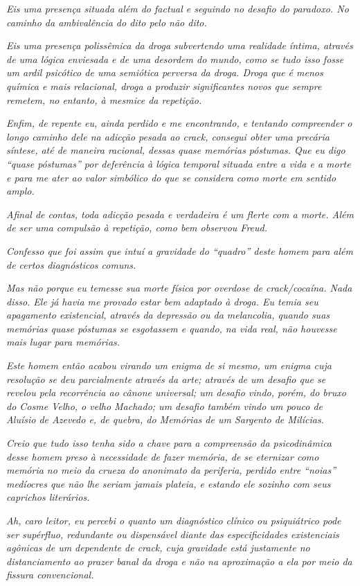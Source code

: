 \emph{Eis uma presença situada além do factual e seguindo no desafio do
paradoxo. No caminho da ambivalência do dito pelo não dito.}~

\emph{Eis uma presença polissêmica da droga subvertendo uma realidade
íntima, através de uma lógica enviesada e de uma desordem do mundo, como
se tudo isso fosse um ardil psicótico de uma semiótica perversa da
droga. Droga que é menos química e mais relacional, droga a produzir
significantes novos que sempre remetem, no entanto, à mesmice da
repetição.}~

\emph{Enfim, de repente eu, ainda perdido e me encontrando, e tentando
compreender o longo caminho dele na adicção pesada ao crack, consegui
obter uma precária síntese, até de maneira racional, dessas quase
memórias póstumas. Que eu digo ``quase póstumas'' por deferência à
lógica temporal situada entre a vida e a morte e para me ater ao valor
simbólico do que se considera como morte em sentido amplo.}~

\emph{Afinal de contas, toda adicção pesada e verdadeira é um flerte com
a morte. Além de ser uma compulsão à repetição, como bem observou
Freud.}

\emph{Confesso que foi assim que intuí a gravidade do ``quadro'' deste
homem para além de certos diagnósticos comuns.}~

\emph{Mas não porque eu temesse sua morte física por overdose de
crack/cocaína. Nada disso. Ele já havia me provado estar bem adaptado à
droga. Eu temia seu apagamento existencial, através da depressão ou da
melancolia, quando suas memórias quase póstumas se esgotassem e quando,
na vida real, não houvesse mais lugar para memórias.}~

\emph{Este homem então acabou virando um enigma de si mesmo, um enigma
cuja resolução se deu parcialmente através da arte; através de um
desafio que se revelou pela recorrência ao cânone universal; um desafio
vindo, porém, do bruxo do Cosme Velho, o velho Machado; um desafio
também vindo um pouco de Aluísio de Azevedo e, de quebra, do \emph{Memórias
de um Sargento de Milícias}.}~

\emph{Creio que tudo isso tenha sido a chave para a compreensão da
psicodinâmica desse homem preso à necessidade de fazer memória, de se
eternizar como memória no meio da crueza do anonimato da periferia,
perdido entre ``noias'' medíocres que não lhe seriam jamais plateia, e
estando ele sozinho com seus caprichos literários.}~

\emph{Ah, caro leitor, eu percebi o quanto um diagnóstico clínico ou
psiquiátrico pode ser supérfluo, redundante ou dispensável diante das
especificidades existenciais agônicas de um dependente de crack, cuja
gravidade está justamente no distanciamento ao prazer banal da droga e
não na aproximação a ela por meio da fissura convencional.}~

